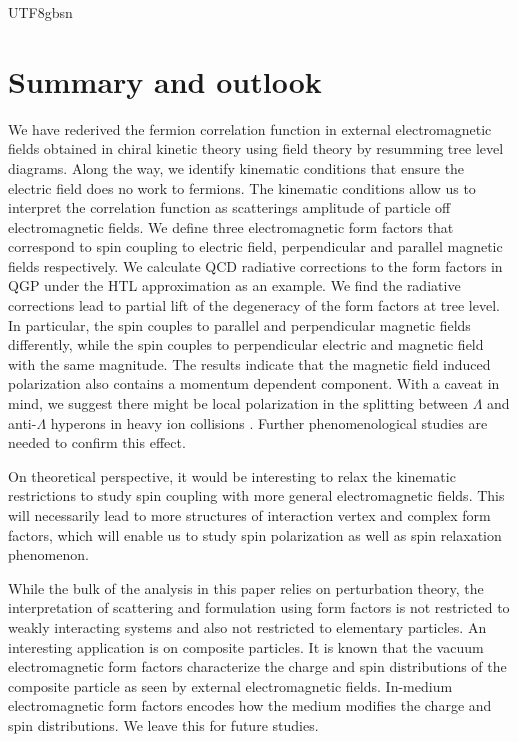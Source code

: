 \documentclass[11pt]{article}\def\baselinestretch{1.4}
\def\L{{\Lambda}}
\begin{document}
\begin{CJK}{UTF8}{gbsn}


\section{Summary and outlook}\label{sec_outlook}

We have rederived the fermion correlation function in external electromagnetic fields obtained in chiral kinetic theory using field theory by resumming tree level diagrams. Along the way, we identify kinematic conditions that ensure the electric field does no work to fermions. The kinematic conditions allow us to interpret the correlation function as scatterings amplitude of particle off electromagnetic fields. We define three electromagnetic form factors that correspond to spin coupling to electric field, perpendicular and parallel magnetic fields respectively. We calculate QCD radiative corrections to the form factors in QGP under the HTL approximation as an example. We find the radiative corrections lead to partial lift of the degeneracy of the form factors at tree level. In particular, the spin couples to parallel and perpendicular magnetic fields differently, while the spin couples to perpendicular electric and magnetic field with the same magnitude. The results indicate that the magnetic field induced polarization also contains a momentum dependent component. With a caveat in mind, we suggest there might be local polarization in the splitting between $\L$ and anti-$\L$ hyperons in heavy ion collisions \cite{Becattini:2016gvu}. Further phenomenological studies are needed to confirm this effect.

On theoretical perspective, it would be interesting to relax the kinematic restrictions to study spin coupling with more general electromagnetic fields. This will necessarily lead to more structures of interaction vertex and complex form factors, which will enable us to study spin polarization as well as spin relaxation phenomenon.

While the bulk of the analysis in this paper relies on perturbation theory, the interpretation of scattering and formulation using form factors is not restricted to weakly interacting systems and also not restricted to elementary particles. An interesting application is on composite particles. It is known that the vacuum electromagnetic form factors characterize the charge and spin distributions of the composite particle as seen by external electromagnetic fields. In-medium electromagnetic form factors encodes how the medium modifies the charge and spin distributions. We leave this for future studies.




\end{CJK}
\end{document}
